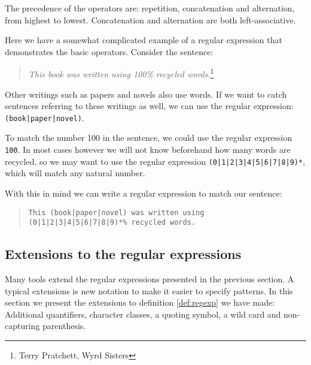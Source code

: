 The precedence of the operators are: repetition, concatenation and
alternation, from highest to lowest. Concatenation and alternation are
both left-associative. 

\begin{example}
  Here we have a somewhat complicated example of a regular expression
  that demonstrates the basic operators.
\label{ex:regular1}
Consider the sentence:
\begin{quote}
\textsl{This book was written using 100\% recycled
  words.}\footnote{Terry Pratchett, Wyrd Sisters}
\end{quote}

Other writings such as papers and novels also use words. If we
want to catch sentences referring to these writings as well, we can
use the regular expression: \texttt{(book|paper|novel)}. 

To match the number 100 in the sentence, we could use the regular
expression \texttt{100}. In most cases however we will not know
beforehand how many words are recycled, so we may want to use the
regular expression \texttt{(0|1|2|3|4|5|6|7|8|9)*}, which will match
any natural number.

With this in mind we can write a regular expression to match our
sentence:
\begin{quote}
  \texttt{This (book|paper|novel) was written using \\
    (0|1|2|3|4|5|6|7|8|9)*\% recycled words.}
\end{quote}

\end{example}

\subsection{Extensions to the regular expressions}

Many tools extend the regular expressions presented in the previous
section. A typical extensions is new notation to make it easier to specify
patterns. In this section we present the extensions to definition
\vref{def:regexp} we have made: Additional quantifiers, character classes,
a quoting symbol, a wild card and non-capturing parenthesis.

